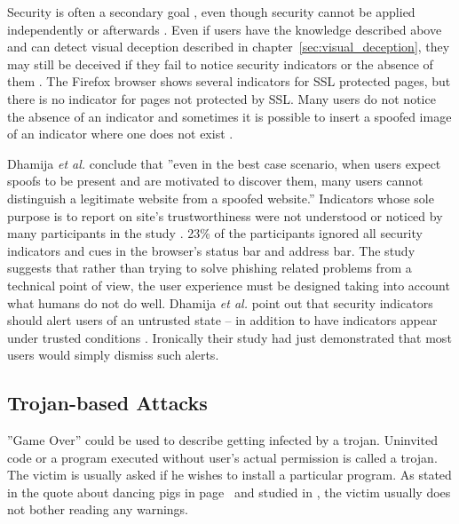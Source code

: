 \documentclass[english,gradu]{tktltiki}
\begin{document}
              Security is often a secondary goal \cite{why_phishing_works_06}, even though security cannot be applied independently or afterwards \cite{schneier_secrets_and_lies_2000, lampson_distributed_1992}. Even if users have the knowledge described above and can detect visual deception described in chapter~\ref{sec:visual_deception}, they may still be deceived if they fail to notice security indicators or the absence of them \cite{why_phishing_works_06}. The Firefox browser shows several indicators for SSL protected pages, but there is no indicator for pages not protected by SSL. Many users do not notice the absence of an indicator and sometimes it is possible to insert a spoofed image of an indicator where one does not exist \cite{why_phishing_works_06}.

              Dhamija \emph{et al.} conclude \cite{why_phishing_works_06} that ''even in the best case scenario, when users expect spoofs to be present and are motivated to discover them, many users cannot distinguish a legitimate website from a spoofed website.'' Indicators whose sole purpose is to report on site's trustworthiness were not understood or noticed by many participants in the study \cite{why_phishing_works_06}. 23\% of the participants ignored all security indicators and cues in the browser's status bar and address bar. The study suggests that rather than trying to solve phishing related problems from a technical point of view, the user experience must be designed taking into account what humans do not do well. Dhamija \emph{et al.} point out that security indicators should alert users of an untrusted state -- in addition to have indicators appear under trusted conditions \cite{why_phishing_works_06}. Ironically their study had just demonstrated that most users would simply dismiss such alerts.



\subsection{Trojan-based Attacks} %
\label{sub:trojan_based_attacks}

            \label{sec:trojans}

            ''Game Over'' could be used to describe getting infected by a trojan. Uninvited code or a program executed without user's actual permission is called a trojan. The victim is usually asked if he wishes to install a particular program. As stated in the quote about dancing pigs in page~\pageref{quote:dancing_pigs} and studied in \cite{why_phishing_works_06}, the victim usually does not bother reading any warnings.
\end{document}
